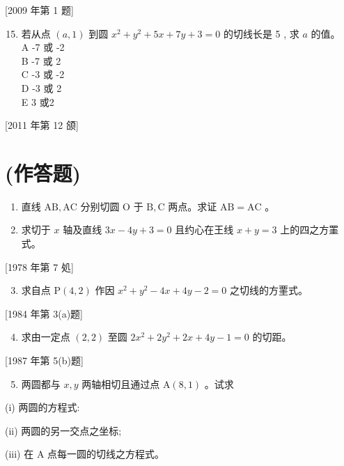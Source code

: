 \documentclass[10pt]{article}
\begin{document}
[2009 年第 1 题]

\begin{enumerate}
  \setcounter{enumi}{14}
  \item 若从点 $(a, 1)$ 到圆 $x^{2}+y^{2}+5 x+7 y+3=0$ 的切线长是 5 , 求 $a$ 的值。\\
A -7 或 -2\\
B -7 或 2\\
C -3 或 -2\\
D -3 或 2\\
E 3 或2
\end{enumerate}

[2011 年第 12 颌]

\section*{(作答题)}
\begin{enumerate}
  \item 直线 $\mathrm{AB}, \mathrm{AC}$ 分别切圆 $\mathrm{O}$ 于 $\mathrm{B}, \mathrm{C}$ 两点。求证 $\mathrm{AB}=\mathrm{AC}$ 。

  \item 求切于 $x$ 轴及直线 $3 x-4 y+3=0$ 且约心在王线 $x+y=3$ 上的四之方罣式。

\end{enumerate}

[1978 年第 7 処]

\begin{enumerate}
  \setcounter{enumi}{2}
  \item 求自点 $\mathrm{P}(4,2)$ 作因 $x^{2}+y^{2}-4 x+4 y-2=0$ 之切线的方䙵式。
\end{enumerate}

[1984 年第 3(a)题]

\begin{enumerate}
  \setcounter{enumi}{3}
  \item 求由一定点 $(2,2)$ 至圆 $2 x^{2}+2 y^{2}+2 x+4 y-1=0$ 的切距。
\end{enumerate}

[1987 年第 5(b)题]

\begin{enumerate}
  \setcounter{enumi}{4}
  \item 两圆都与 $x, y$ 两轴相切且通过点 $\mathrm{A}(8,1)$ 。试求
\end{enumerate}

(i) 两圆的方程式:

(ii) 两圆的另一交点之坐标;

(iii) 在 $\mathrm{A}$ 点每一圆的切线之方程式。
\end{document}
